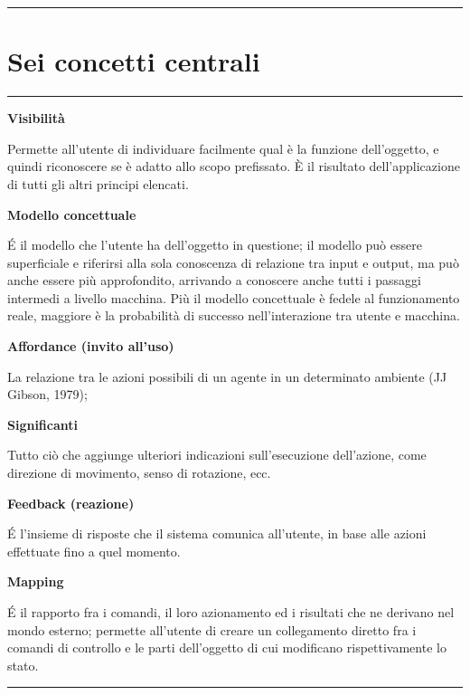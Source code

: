 \documentclass[11pt,a4paper]{book}
\begin{document}
\noindent\rule{\textwidth}{1pt}

\section{Sei concetti centrali}
\noindent\rule{\textwidth}{1pt}
\begin{center}
	\textbf{Visibilità}
\end{center}
Permette all’utente di individuare facilmente qual è la funzione dell’oggetto, e quindi riconoscere se è adatto allo scopo prefissato. È il risultato dell’applicazione di tutti gli altri principi elencati.

\begin{center}
	\textbf{Modello concettuale}
\end{center}
É il modello che l’utente ha dell’oggetto in questione; il modello può essere superficiale e riferirsi alla sola conoscenza di relazione tra input e output, ma può anche essere più approfondito, arrivando a conoscere anche tutti i passaggi intermedi a livello macchina. Più il modello concettuale è fedele al funzionamento reale, maggiore è la probabilità di successo nell’interazione tra utente e macchina.

\begin{center}
	\textbf{Affordance (invito all’uso)}
\end{center}
La relazione tra le azioni possibili di un agente in un determinato ambiente (JJ Gibson, 1979);

\begin{center}
	\textbf{Significanti}
\end{center}
Tutto ciò che aggiunge ulteriori indicazioni sull’esecuzione dell’azione, come direzione di movimento, senso di rotazione, ecc.

\begin{center}
	\textbf{Feedback (reazione)}
\end{center}
É l’insieme di risposte che il sistema comunica all’utente, in base alle azioni effettuate fino a quel momento.

\begin{center}
	\textbf{Mapping}
\end{center}	
É il rapporto fra i comandi, il loro azionamento ed i risultati che ne derivano nel mondo esterno; permette all’utente di creare un collegamento diretto fra i comandi di controllo e le parti dell’oggetto di cui modificano rispettivamente lo stato.

\noindent\rule{\textwidth}{1pt}
\end{document}
